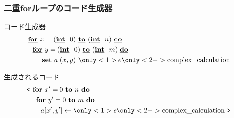 

%

\begin{frame}[fragile]
  \frametitle{二重forループのコード生成器}
  コード生成器
  \begin{align*}
    & \cfordo{x = (\cint~0)}{(\cint~n)} \\
    & ~~\cfordo{y = (\cint~0)}{(\cint~m)} \\
    & ~~~~~~\caryset{a}{(x,y)}{\only<1>{e} \only<2->{\text{complex\_calculation}}}
  \end{align*}

  \begin{center}
    \LARGE \downtoo
  \end{center}
  生成されるコード
  \begin{align*}
    &\cbra~ \fordo{x' = 0}{n} \\
    & ~~~~\fordo{y' = 0}{m} \\
    & ~~~~~~\aryset{a}{x',y'}{\only<1>{e} \only<2->{\text{complex\_calculation}}}~ \cket
  \end{align*}
\end{frame}

